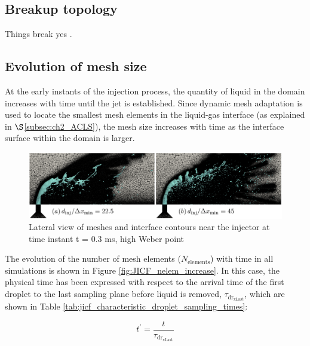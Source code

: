 \clearpage

\subsection{Breakup topology}

Things break yes .

\subsection{Evolution of mesh size}

At the early instants of the injection process, the quantity of liquid in the domain increases with time until the jet is established. Since dynamic mesh adaptation is used to locate the smallest mesh elements in the liquid-gas interface (as explained in $\S$\ref{subsec:ch2_ACLS}), the mesh size increases with time as the interface surface within the domain is larger. 

\begin{figure}[ht]
\centering
	\centering
   \includegraphics[scale=0.25]{./part2_developments/figures_ch5_resolved_JICF/JICF_nelem_evolution/JICF_w_mesh}
\caption{Lateral view of meshes and interface contours near the injector at time instant t = 0.3 ms, high Weber point}
\label{fig:JICF_w_mesh}
\end{figure}

The evolution of the number of mesh elements ($N_\mathrm{elements}$) with time in all simulations is shown in Figure \ref{fig:JICF_nelem_increase}. In this case, the physical time has been expressed with respect to the arrival time of the first droplet to the last sampling plane before liquid is removed, $\tau_\mathrm{dr_{xLast}}$, which are shown in Table \ref{tab:jicf_characteristic_droplet_sampling_times}:

\begin{equation}
t^{\prime} = \frac{t}{\tau_\mathrm{dr_{xLast}}}
\end{equation}

